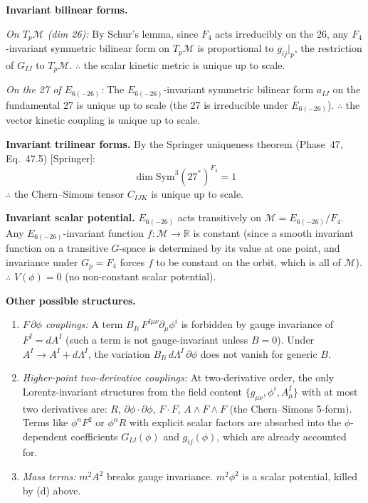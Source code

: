 \textbf{Invariant bilinear forms.}

\textit{On $T_p\mathcal{M}$ (dim 26):}
By Schur's lemma, since $F_4$ acts irreducibly on the 26, any
$F_4$-invariant symmetric bilinear form on $T_p\mathcal{M}$ is proportional
to $g_{ij}|_p$, the restriction of $G_{IJ}$ to $T_p\mathcal{M}$.
$\therefore$ the scalar kinetic metric is unique up to scale.

\textit{On the 27 of $E_{6(-26)}$:}
The $E_{6(-26)}$-invariant symmetric bilinear form $a_{IJ}$ on the
fundamental 27 is unique up to scale (the 27 is irreducible under $E_{6(-26)}$).
$\therefore$ the vector kinetic coupling is unique up to scale.

\textbf{Invariant trilinear forms.}
By the Springer uniqueness theorem (Phase~47, Eq.~47.5) [Springer]:
$$
  \dim \mathrm{Sym}^3(27^*)^{F_4} = 1
$$
$\therefore$ the Chern--Simons tensor $C_{IJK}$ is unique up to scale.

\textbf{Invariant scalar potential.}
$E_{6(-26)}$ acts transitively on $\mathcal{M} = E_{6(-26)}/F_4$.
Any $E_{6(-26)}$-invariant function $f: \mathcal{M} \to \mathbb{R}$ is constant
(since a smooth invariant function on a transitive $G$-space is determined by
its value at one point, and invariance under $G_p = F_4$ forces $f$
to be constant on the orbit, which is all of $\mathcal{M}$).
$\therefore$ $V(\phi) = 0$ (no non-constant scalar potential).

\textbf{Other possible structures.}
\begin{enumerate}
  \item[(a)] \textit{$F\,\partial\phi$ couplings:} A term
    $B_{Ii}\,F^{I\mu\nu}\partial_\mu\phi^i$ is forbidden by gauge invariance
    of $F^I = dA^I$ (such a term is not gauge-invariant unless $B = 0$).
    Under $A^I \to A^I + d\Lambda^I$, the variation $B_{Ii}\,d\Lambda^I\,\partial\phi$
    does not vanish for generic $B$.
  \item[(b)] \textit{Higher-point two-derivative couplings:} At two-derivative
    order, the only Lorentz-invariant structures from the field content
    $\{g_{\mu\nu}, \phi^i, A^I_\mu\}$ with at most two derivatives are:
    $R$, $\partial\phi \cdot \partial\phi$, $F \cdot F$, $A \wedge F \wedge F$
    (the Chern--Simons 5-form).
    Terms like $\phi^n F^2$ or $\phi^n R$ with explicit scalar factors
    are absorbed into the $\phi$-dependent coefficients $G_{IJ}(\phi)$ and
    $g_{ij}(\phi)$, which are already accounted for.
  \item[(c)] \textit{Mass terms:} $m^2 A^2$ breaks gauge invariance.
    $m^2 \phi^2$ is a scalar potential, killed by (d) above.
\end{enumerate}

